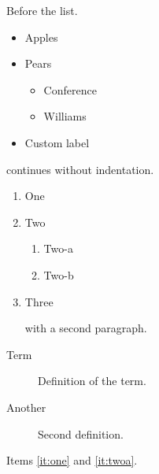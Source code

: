 \documentclass{article}
\begin{document}
Before the list.
\begin{itemize}
  \item Apples
  \item Pears
  \begin{itemize}
    \item Conference
    \item Williams
  \end{itemize}
  \item[--] Custom label
\end{itemize}
continues without indentation.

\begin{enumerate}
  \item One\label{it:one}
  \item Two
  \begin{enumerate}
    \item Two-a\label{it:twoa}
    \item Two-b
  \end{enumerate}
  \item Three

  with a second paragraph.
\end{enumerate}
\begin{description}
  \item[Term] Definition of the term.
  \item[Another] Second definition.
\end{description}
Items \ref{it:one} and \ref{it:twoa}.
\end{document}
